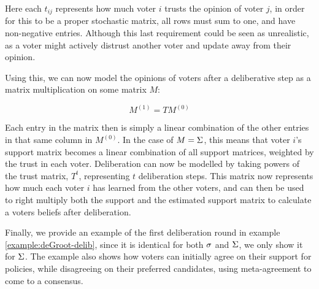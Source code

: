 Here each $t_{ij}$ represents how much voter $i$ trusts the opinion of voter $j$, in order for this to be a proper stochastic matrix, all rows must sum to one, and have non-negative entries. Although this last requirement could be seen as unrealistic, as a voter might actively distrust another voter and update away from their opinion.

Using this, we can now model the opinions of voters after a deliberative step as a matrix multiplication on some matrix $M$:

\begin{equation}
	M^{(1)} = TM^{(0)}
	\label{eq:update_degroot}
\end{equation}

Each entry in the matrix then is simply a linear combination of the other entries in that same column in $M^{(0)}$. In the case of $M = \Sigma$, this means that voter $i$'s support matrix becomes a linear combination of all support matrices, weighted by the trust in each voter. Deliberation can now be modelled by taking powers of the trust matrix, $T^{t}$, representing $t$ deliberation steps. This matrix now represents how much each voter $i$ has learned from the other voters, and can then be used to right multiply both the support and the estimated support matrix to calculate a voters beliefs after deliberation.

Finally, we provide an example of the first deliberation round in example \ref{example:deGroot-delib}, since it is identical for both $\sigma$ and  $\Sigma$, we only show it for $\Sigma$. The example also shows how voters can initially agree on their support for policies, while disagreeing on their preferred candidates, using meta-agreement to come to a consensus.

